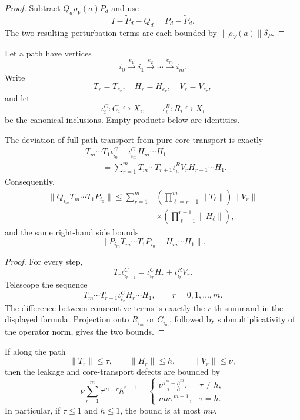 \begin{proof}
Subtract \(Q_d\rho_V(a)P_d\) and use
\[
I-\widetilde P_d-Q_d=P_d-\widetilde P_d.
\]
The two resulting perturbation terms are each bounded by
\(\|\rho_V(a)\|\delta_P\).
\end{proof}


Let a path have vertices
\[
i_0\xrightarrow{e_1}i_1\xrightarrow{e_2}\cdots
\xrightarrow{e_m}i_m.
\]
Write
\[
T_r=T_{e_r},
\quad
H_r=H_{e_r},
\quad
V_r=V_{e_r},
\]
and let
\[
\iota_i^C:C_i\hookrightarrow X_i,
\qquad
\iota_i^R:R_i\hookrightarrow X_i
\]
be the canonical inclusions. Empty products below are identities.

\begin{theorem}\label{thm:residual-duhamel}
The deviation of full path transport from pure core transport is exactly
\[
\boxed{
\begin{aligned}
&T_m\cdots T_1\iota_{i_0}^C
-
\iota_{i_m}^C H_m\cdots H_1\\
&\qquad=
\sum_{r=1}^{m}
T_m\cdots T_{r+1}
\iota_{i_r}^R V_r
H_{r-1}\cdots H_1.
\end{aligned}
}
\]
Consequently,
\[
\boxed{
\begin{aligned}
\|Q_{i_m}T_m\cdots T_1P_{i_0}\|
\leq
\sum_{r=1}^{m}
&\left(\prod_{\ell=r+1}^{m}\|T_\ell\|\right)
\|V_r\|\\
&\times
\left(\prod_{\ell=1}^{r-1}\|H_\ell\|\right),
\end{aligned}
}
\]
and the same right-hand side bounds
\[
\|P_{i_m}T_m\cdots T_1P_{i_0}-H_m\cdots H_1\|.
\]
\end{theorem}

\begin{proof}
For every step,
\[
T_r\iota_{i_{r-1}}^C
=
\iota_{i_r}^CH_r+
\iota_{i_r}^RV_r.
\]
Telescope the sequence
\[
T_m\cdots T_{r+1}\iota_{i_r}^C H_r\cdots H_1,
\qquad
r=0,1,\ldots,m.
\]
The difference between consecutive terms is exactly the \(r\)-th summand in
the displayed formula. Projection onto \(R_{i_m}\) or \(C_{i_m}\), followed
by submultiplicativity of the operator norm, gives the two bounds.
\end{proof}

\begin{corollary}\label{cor:uniform-path-bound}
If along the path
\[
\|T_r\|\leq\tau,
\qquad
\|H_r\|\leq h,
\qquad
\|V_r\|\leq\nu,
\]
then the leakage and core-transport defects are bounded by
\[
\boxed{
\nu\sum_{r=1}^{m}\tau^{m-r}h^{r-1}
=
\begin{cases}
\displaystyle
\nu\frac{\tau^m-h^m}{\tau-h},&\tau\neq h,\\[1.1em]
\displaystyle
m\nu\tau^{m-1},&\tau=h.
\end{cases}
}
\]
In particular, if \(\tau\leq1\) and \(h\leq1\), the bound is at most
\(m\nu\).
\end{corollary}

